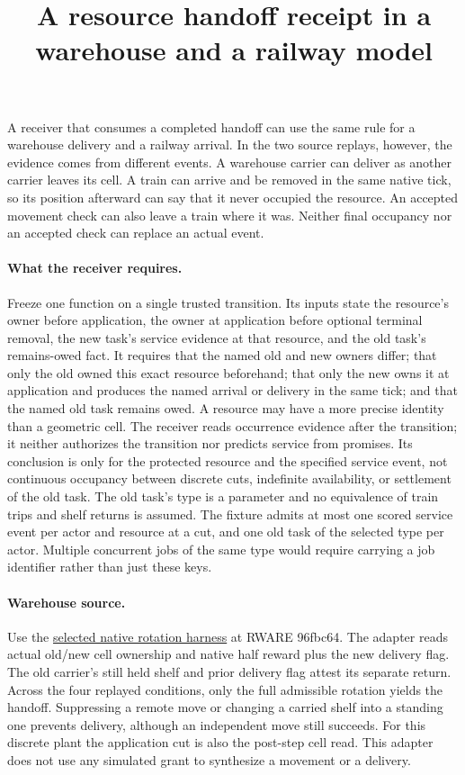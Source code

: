 \documentclass[11pt]{article}
\title{A resource handoff receipt in a warehouse and a railway model}
\author{}
\date{}
\begin{document}
\maketitle

A receiver that consumes a completed handoff can use the same rule for a warehouse delivery and a railway arrival. In the two source replays, however, the evidence comes from different events. A warehouse carrier can deliver as another carrier leaves its cell. A train can arrive and be removed in the same native tick, so its position afterward can say that it never occupied the resource. An accepted movement check can also leave a train where it was. Neither final occupancy nor an accepted check can replace an actual event.

\paragraph{What the receiver requires.}
Freeze one function on a single trusted transition. Its inputs state the resource's owner before application, the owner at application before optional terminal removal, the new task's service evidence at that resource, and the old task's remains-owed fact. It requires that the named old and new owners differ; that only the old owned this exact resource beforehand; that only the new owns it at application and produces the named arrival or delivery in the same tick; and that the named old task remains owed. A resource may have a more precise identity than a geometric cell. The receiver reads occurrence evidence after the transition; it neither authorizes the transition nor predicts service from promises. Its conclusion is only for the protected resource and the specified service event, not continuous occupancy between discrete cuts, indefinite availability, or settlement of the old task. The old task's type is a parameter and no equivalence of train trips and shelf returns is assumed. The fixture admits at most one scored service event per actor and resource at a cut, and one old task of the selected type per actor. Multiple concurrent jobs of the same type would require carrying a job identifier rather than just these keys.

\paragraph{Warehouse source.}
Use the \href{https://github.com/eternal-november/eos-research-programmes/pull/428}{selected native rotation harness} at RWARE 96fbc64. The adapter reads actual old/new cell ownership and native half reward plus the new delivery flag. The old carrier's still held shelf and prior delivery flag attest its separate return. Across the four replayed conditions, only the full admissible rotation yields the handoff. Suppressing a remote move or changing a carried shelf into a standing one prevents delivery, although an independent move still succeeds. For this discrete plant the application cut is also the post-step cell read. This adapter does not use any simulated grant to synthesize a movement or a delivery.
\end{document}
